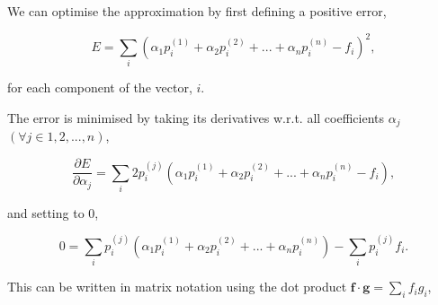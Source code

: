 \documentclass[12pt]{article}
\begin{document}
\vspace{5mm}

We can optimise the approximation by first defining a positive error,

\vspace{4mm}

$$ E = \sum_i \left(\alpha_1 p_i^{(1)} + \alpha_2 p_i^{(2)} + ... + \alpha_n p_i^{(n)} - f_i \right)^2,$$

\vspace{5mm}

for each component of the vector, $i$.

\vspace{5mm}

The error is minimised by taking its derivatives w.r.t. all coefficients $\alpha_j$ $\left( \forall j \in 1,2, ..., n \right)$,

\vspace{4mm}

$$ \frac{\partial E}{\partial \alpha_j} = \sum_i 2 p_i^{(j)} \left(\alpha_1 p_i^{(1)} + \alpha_2 p_i^{(2)} + ... + \alpha_n p_i^{(n)} - f_i \right),$$

\vspace{5mm}

and setting to 0,

\vspace{4mm}

$$ 0 = \sum_i p_i^{(j)} \left(\alpha_1 p_i^{(1)} + \alpha_2 p_i^{(2)} + ... + \alpha_n p_i^{(n)} \right) - \sum_i p_i^{(j)} f_i. $$

\vspace{5mm}

This can be written in matrix notation using the dot product $ \mathbf{f} \cdot \mathbf{g} = \sum_i f_i g_i $, 

\vspace{4mm}
\end{document}
